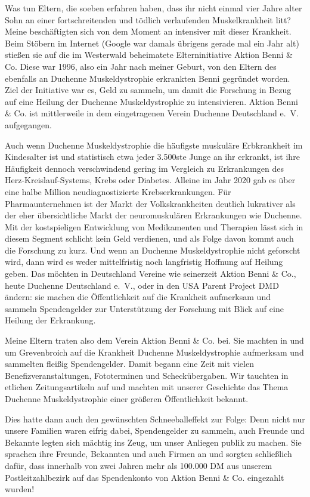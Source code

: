 \documentclass[fontsize=12pt,a4paper,headinclude,DIV=calc,automark]{scrbook}
\begin{document}
Was tun Eltern, die soeben erfahren haben, dass ihr nicht einmal vier Jahre alter Sohn an einer fortschreitenden und tödlich verlaufenden Muskelkrankheit litt? Meine beschäftigten sich von dem Moment an intensiver mit dieser Krankheit. Beim Stöbern im Internet (Google war damals übrigens gerade mal ein Jahr alt) stießen sie auf die im Westerwald beheimatete Elterninitiative Aktion Benni \& Co. Diese war 1996, also ein Jahr nach meiner Geburt, von den Eltern des ebenfalls an Duchenne Muskeldystrophie erkrankten Benni gegründet worden. Ziel der Initiative war es, Geld zu sammeln, um damit die Forschung in Bezug auf eine Heilung der Duchenne Muskeldystrophie zu intensivieren. Aktion Benni \& Co. ist mittlerweile in dem eingetragenen Verein Duchenne Deutschland e.~V. aufgegangen.

Auch wenn Duchenne Muskeldystrophie die häufigste muskuläre Erbkrankheit im Kindesalter ist und statistisch etwa jeder 3.500ste Junge an ihr erkrankt, ist ihre Häufigkeit dennoch verschwindend gering im Vergleich zu Erkrankungen des Herz-Kreislauf-Systems, Krebs oder Diabetes. Alleine im Jahr 2020 gab es über eine halbe Million neudiagnostizierte Krebserkrankungen. Für Pharmaunternehmen ist der Markt der Volkskrankheiten deutlich lukrativer als der eher übersichtliche Markt der neuromuskulären Erkrankungen wie Duchenne. Mit der kostspieligen Entwicklung von Medikamenten und Therapien lässt sich in diesem Segment schlicht kein Geld verdienen, und als Folge davon kommt auch die Forschung zu kurz. Und wenn an Duchenne Muskeldystrophie nicht geforscht wird, dann wird es weder mittelfristig noch langfristig Hoffnung auf Heilung geben. Das möchten in Deutschland Vereine wie seinerzeit Aktion Benni \& Co., heute Duchenne Deutschland e.~V., oder in den USA Parent Project DMD ändern: sie machen die Öffentlichkeit auf die Krankheit aufmerksam und sammeln Spendengelder zur Unterstützung der Forschung mit Blick auf eine Heilung der Erkrankung.

Meine Eltern traten also dem Verein Aktion Benni \& Co. bei. Sie machten in und um Grevenbroich auf die Krankheit Duchenne Muskeldystrophie aufmerksam und sammelten fleißig Spendengelder. Damit begann eine Zeit mit vielen Benefizveranstaltungen, Fototerminen und Scheckübergaben. Wir tauchten in etlichen Zeitungsartikeln auf und machten mit unserer Geschichte das Thema Duchenne Muskeldystrophie einer größeren Öffentlichkeit bekannt.

Dies hatte dann auch den gewünschten Schneeballeffekt zur Folge: Denn nicht nur unsere Familien waren eifrig dabei, Spendengelder zu sammeln, auch Freunde und Bekannte legten sich mächtig ins Zeug, um unser Anliegen publik zu machen. Sie sprachen ihre Freunde, Bekannten und auch Firmen an und sorgten schließlich dafür, dass innerhalb von zwei Jahren mehr als 100.000 DM aus unserem Postleitzahlbezirk auf das Spendenkonto von Aktion Benni \& Co. eingezahlt wurden!
\end{document}
